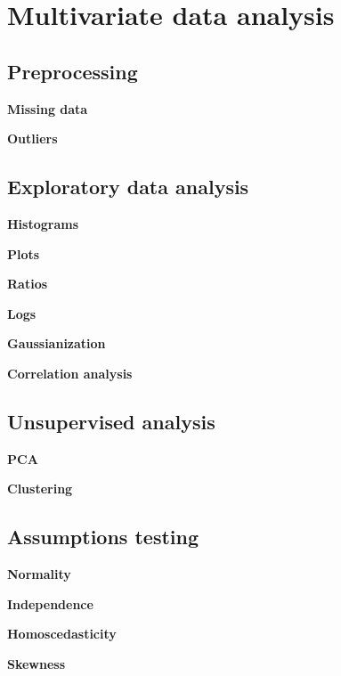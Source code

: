 \section{Multivariate data analysis}

\subsection{Preprocessing}

\textbf{Missing data}

\textbf{Outliers}


\subsection{Exploratory data analysis}

\textbf{Histograms}

\textbf{Plots}

\textbf{Ratios}

\textbf{Logs}

\textbf{Gaussianization}

\textbf{Correlation analysis}

\subsection{Unsupervised analysis}

\textbf{PCA}

\textbf{Clustering}

\subsection{Assumptions testing}


\textbf{Normality}

\textbf{Independence}

\textbf{Homoscedasticity}

\textbf{Skewness}

